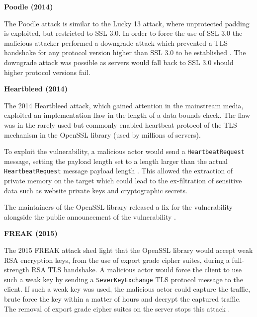 \documentclass{mscreport}
\begin{document}
\vspace{0.6cm} \noindent
\textbf{Poodle (2014)}

\vspace{0.2cm} \noindent
The Poodle attack is similar to the Lucky 13 attack, where unprotected padding is exploited, but restricted to SSL 3.0. In order to force the use of SSL 3.0 the malicious attacker performed a downgrade attack which prevented a TLS handshake for any protocol version higher than SSL 3.0 to be established \cite{Ristic2017-aj,Al_Fardan2013-sw}. The downgrade attack was possible as servers would fall back to SSL 3.0 should higher protocol versions fail.


\vspace{0.6cm} \noindent
\textbf{Heartbleed (2014)}

\vspace{0.2cm} \noindent
The 2014 Heartbleed attack, which gained attention in the mainstream media, exploited an implementation flaw in the length of a data bounds check. The flaw was in the rarely used but commonly enabled heartbeat protocol \cite{Durumeric2014-yj} of the TLS mechanism in the OpenSSL library (used by millions of servers).

\vspace{0.2cm} \noindent
To exploit the vulnerability, a malicious actor would send a \texttt{HeartbeatRequest} message, setting the payload length set to a length larger than the actual \texttt{HeartbeatRequest} message payload length \cite{Durumeric2014-yj}. This allowed the extraction of private memory on the target which could lead to the ex-filtration of sensitive data such as website private keys and cryptographic secrets.

\vspace{0.3cm} \noindent
The maintainers of the OpenSSL library released a fix for the vulnerability alongside the public announcement of the vulnerability \cite{Durumeric2014-yj}.


\vspace{0.6cm} \noindent
\textbf{FREAK (2015)}

\vspace{0.2cm} \noindent
The 2015 FREAK attack shed light that the OpenSSL library would accept weak RSA encryption keys, from the use of export grade cipher suites, during a full-strength RSA TLS handshake. A malicious actor would force the client to use such a weak key by sending a \texttt{SeverKeyExchange} TLS protocol message to the client. If such a weak key was used, the malicious actor could capture the traffic, brute force the key within a matter of hours and decrypt the captured traffic. The removal of export grade cipher suites on the server stops this attack \cite{Ristic2017-aj,Beurdouche2015-ga}.
\end{document}

